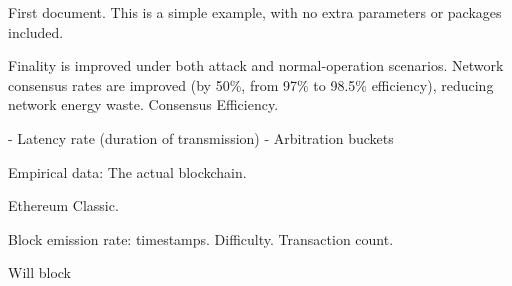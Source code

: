\documentclass{article}
\begin{document}
First document. This is a simple example, with no 
extra parameters or packages included.


Finality is improved under both attack and normal-operation scenarios.
Network consensus rates are improved (by 50\%, from 97\% to 98.5\% efficiency), reducing network energy waste. Consensus Efficiency.

- Latency rate (duration of transmission)
- Arbitration buckets




	Empirical data:
	The actual blockchain.

	Ethereum Classic.

	Block emission rate: timestamps.
	Difficulty.
	Transaction count.

	Will block 
\end{document}
